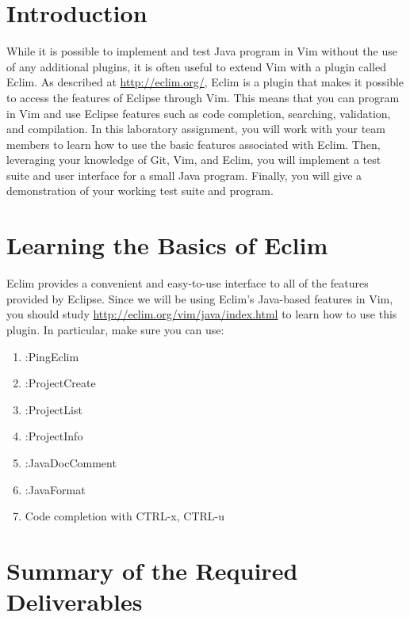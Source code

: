 

\usepackage[compact]{titlesec}



\section*{Introduction}

While it is possible to implement and test Java program in Vim without the use of any additional plugins, it is often
useful to extend Vim with a plugin called Eclim.  As described at \url{http://eclim.org/}, Eclim is a plugin that makes
it possible to access the features of Eclipse through Vim.  This means that you can program in Vim and use Eclipse
features such as code completion, searching, validation, and compilation. In this laboratory assignment, you will work
with your team members to learn how to use the basic features associated with Eclim.  Then, leveraging your knowledge of
Git, Vim, and Eclim, you will implement a test suite and user interface for a small Java program.  Finally, you will 
give a demonstration of your working test suite and program.

\section*{Learning the Basics of Eclim}

Eclim provides a convenient and easy-to-use interface to all of the features provided by Eclipse.  Since we will be
using Eclim's Java-based features in Vim, you should study \url{http://eclim.org/vim/java/index.html} to learn how to
use this plugin.  In particular, make sure you can use:

\begin{enumerate}
	\item :PingEclim
	\item :ProjectCreate
	\item :ProjectList
	\item :ProjectInfo
	\item :JavaDocComment
	\item :JavaFormat
	\item Code completion with CTRL-x, CTRL-u 
\end{enumerate}

\section*{Summary of the Required Deliverables}

